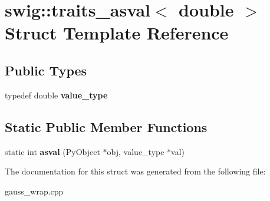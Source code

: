 \hypertarget{structswig_1_1traits__asval_3_01double_01_4}{\section{swig\-:\-:traits\-\_\-asval$<$ double $>$ Struct Template Reference}
\label{structswig_1_1traits__asval_3_01double_01_4}
}
\subsection*{Public Types}
\begin{DoxyCompactItemize}
\item 
\hypertarget{structswig_1_1traits__asval_3_01double_01_4_acc549718ce52880c4368a2e37f3ff544}{typedef double {\bfseries value\-\_\-type}}\label{structswig_1_1traits__asval_3_01double_01_4_acc549718ce52880c4368a2e37f3ff544}

\end{DoxyCompactItemize}
\subsection*{Static Public Member Functions}
\begin{DoxyCompactItemize}
\item 
\hypertarget{structswig_1_1traits__asval_3_01double_01_4_aa2b3a8491625ce70a1bb03c1cc851d9a}{static int {\bfseries asval} (Py\-Object $\ast$obj, value\-\_\-type $\ast$val)}\label{structswig_1_1traits__asval_3_01double_01_4_aa2b3a8491625ce70a1bb03c1cc851d9a}

\end{DoxyCompactItemize}


The documentation for this struct was generated from the following file\-:\begin{DoxyCompactItemize}
\item 
gauss\-\_\-wrap.\-cpp\end{DoxyCompactItemize}
